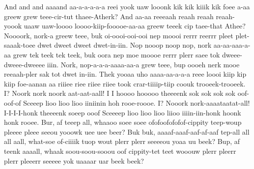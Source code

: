 \documentclass[12pt,a4paper]{article}
\begin{document}
\begin{drama}
\epopspeaks
And and and aaaand aa-a-a-a-a-a reei yook uaw looonk kik kik kiiik kik foee a-aa greew grew teee-cir-tut thaee-Atherk? And aa-aa reeeaah reaah reaah reaah-yoook uaaw uaw-loooo loooo-kiip-fooooe-aa-aa greew teeek cip taee-that Athee?
\euelspeaks
Noooork, nork-a greew teee, buk oi-oooi-ooi-ooi nep moooi rerrr reerrr pleet plet-saaak-toee dwet dweet dweet dwet-in-iin. Nop nooop noop nop, nork aa-aa-aaa-a-aa grew tek teek tek teek, buk oora nep moe moooe rerrr plerr saee tok dweee-dweee-dweeee iiin. Nork, nop-a-a-a-aaaa-aa-a grew teee, bup oooeh nerk mooe reeaah-pler sak tot dwet in-iin.
\epopspeaks
Thek yooaa uho aaaa-aa-a-a-a reee loooi kiip kip kiip foe-aanan aa riiiee riee riiee riiee took crar-tiiiip-tiip coouk trooeek-trooeek.
\euelspeaks
I? Noork nork noork aat-aat-aall! I I hoooo hooooo theeeenk sok sok sok sok oof-oof-of Sceeep lioo lioo lioo iiniinin hoh rooe-roooe. I? Nooork nork-aaaataatat-all! I-I-I-I-honk theeeenk soeep ooof Sceeeep lioo lioo lioo liioo iiiin-iin-honk hoonk honk rooee.
\epopspeaks
Bur, af teeep all, whaaoo soee soee ofofoofofofof-cippity teep-woup pleeee pleee seeou yooowk uee uee beer? Buk buk, aaaaf-aaaf-aaf-af-aaf tep-all all all aall, what-soe of-ciiiik tuop wout plerr plerr seeeeou yoaa uu beek? Bup, af teenk aaaall, whaak soou-soou-sooou oof cippity-tet teet wooouw plerr pleerr plerr pleeerr seeeee yok uaaaar uar beek beek?
\euelspeaks

\end{drama}
\end{document}

